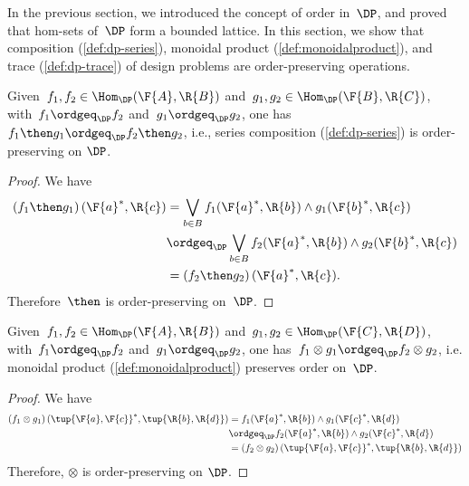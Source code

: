 In the previous section, we introduced the concept of order in~$\DP$, and proved that hom-sets of~$\DP$ form a bounded lattice. In this section, we show that composition (\cref{def:dp-series}), monoidal product (\cref{def:monoidalproduct}), and trace (\cref{def:dp-trace}) of design problems are order-preserving operations.
\begin{lemma}
Given~$f_1,f_2 \in \Hom_\DP(\F{A},\R{B})$ and~$g_1,g_2 \in \Hom_\DP(\F{B},\R{C})$, with~$f_1\ordgeq_\DP f_2$ and~$g_1\ordgeq_\DP g_2$, one has~$f_1\then g_1 \ordgeq_\DP f_2\then g_2$, i.e., series composition (\cref{def:dp-series}) is order-preserving on $\DP$.
\end{lemma}

\begin{proof}
We have
\begin{equation}
    \begin{aligned}
    \left( f_1\then g_1\right)(\F{a}^*,\R{c})&=\bigvee_{b\in B}f_1(\F{a}^*,\R{b})\wedge g_1(\F{b}^*,\R{c})\\
    &\ordgeq_\DP \bigvee_{b\in B} f_2(\F{a}^*,\R{b})\wedge g_2(\F{b}^*,\R{c})\\
    &=\left( f_2\then g_2\right)(\F{a}^*,\R{c}).
    \end{aligned}
\end{equation}
Therefore~$\then$ is order-preserving on~$\DP$.
\end{proof}

\begin{lemma}
Given~$f_1,f_2 \in \Hom_\DP(\F{A},\R{B})$ and~$g_1,g_2 \in \Hom_\DP(\F{C},\R{D})$, with~$f_1\ordgeq_\DP f_2$ and~$g_1\ordgeq_\DP g_2$, one has~$f_1\otimes g_1 \ordgeq_\DP f_2\otimes g_2$, i.e. monoidal product (\cref{def:monoidalproduct}) preserves order on~$\DP$.
\end{lemma}

\begin{proof}
We have
\begin{equation}
    \begin{aligned}
    \left( f_1\otimes g_1\right) (\tup{\F{a},\F{c}}^*,\tup{\R{b},\R{d}})&=f_1(\F{a}^*,\R{b})\wedge g_1(\F{c}^*,\R{d})\\
    &\ordgeq_\DP f_2(\F{a}^*,\R{b})\wedge g_2(\F{c}^*,\R{d})\\
    &=\left( f_2\otimes g_2\right) (\tup{\F{a},\F{c}}^*,\tup{\R{b},\R{d}})
    \end{aligned}
\end{equation}
Therefore, $\otimes$ is order-preserving on $\DP$.
\end{proof}

